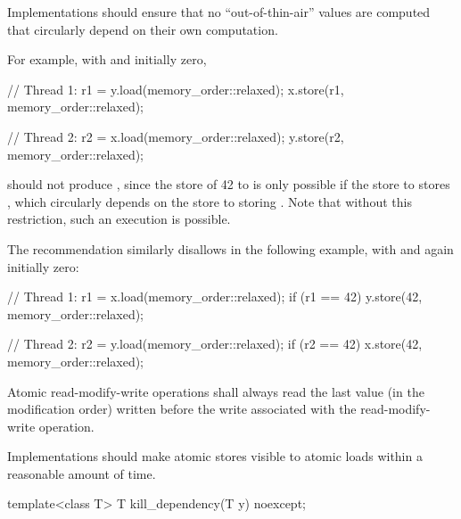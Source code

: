 \pnum
Implementations should ensure that no ``out-of-thin-air'' values are computed that
circularly depend on their own computation.

\begin{note} For example, with  and  initially zero,

\begin{codeblock}
// Thread 1:
r1 = y.load(memory_order::relaxed);
x.store(r1, memory_order::relaxed);
\end{codeblock}

\begin{codeblock}
// Thread 2:
r2 = x.load(memory_order::relaxed);
y.store(r2, memory_order::relaxed);
\end{codeblock}

should not produce , since the store of 42 to  is only
possible if the store to  stores , which circularly depends on the
store to  storing . Note that without this restriction, such an
execution is possible.
\end{note}

\pnum
\begin{note} The recommendation similarly disallows  in the
following example, with  and  again initially zero:

\begin{codeblock}
// Thread 1:
r1 = x.load(memory_order::relaxed);
if (r1 == 42) y.store(42, memory_order::relaxed);
\end{codeblock}

\begin{codeblock}
// Thread 2:
r2 = y.load(memory_order::relaxed);
if (r2 == 42) x.store(42, memory_order::relaxed);
\end{codeblock}

\end{note}

\pnum
Atomic read-modify-write operations shall always read the last value
(in the modification order) written before the write associated with
the read-modify-write operation.

\pnum
Implementations should make atomic stores visible to atomic loads within a reasonable
amount of time.

%
\begin{itemdecl}
template<class T>
  T kill_dependency(T y) noexcept;
\end{itemdecl}

